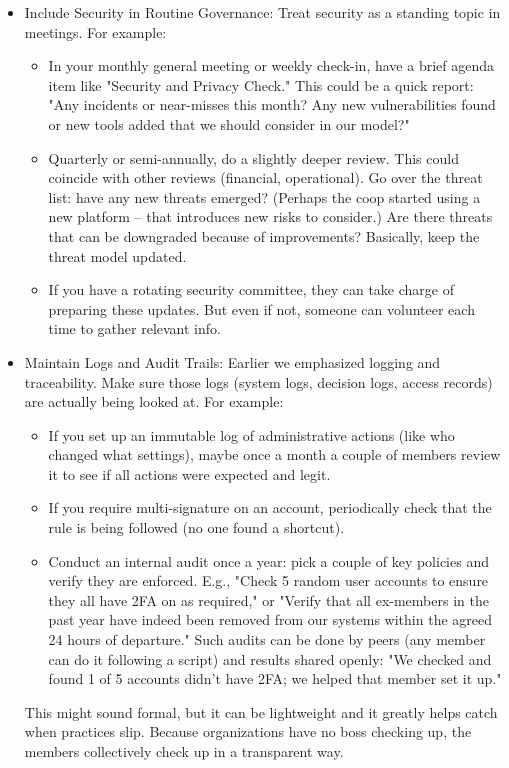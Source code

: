 \begin{itemize}   

    \item Include Security in Routine Governance: Treat security as a standing topic in meetings. For
    example:
        \begin{itemize}
            \item In your monthly general meeting or weekly check-in, have a brief agenda item like
            "Security and Privacy Check." This could be a quick report: "Any incidents or near-misses this
            month? Any new vulnerabilities found or new tools added that we should consider in our model?"
            \item Quarterly or semi-annually, do a slightly deeper review. This could coincide with other
            reviews (financial, operational). Go over the threat list: have any new threats emerged? (Perhaps
            the coop started using a new platform – that introduces new risks to consider.) Are there threats
            that can be downgraded because of improvements? Basically, keep the threat model updated.
            \item If you have a rotating security committee, they can take charge of preparing these updates.
            But even if not, someone can volunteer each time to gather relevant info.
        \end{itemize}

    \item Maintain Logs and Audit Trails: Earlier we emphasized logging and traceability. Make sure
    those logs (system logs, decision logs, access records) are actually being looked at. For example:
        \begin{itemize}
            \item If you set up an immutable log of administrative actions (like who changed what settings),
            maybe once a month a couple of members review it to see if all actions were expected and legit.
            \item If you require multi-signature on an account, periodically check that the rule is being
            followed (no one found a shortcut).
            \item Conduct an internal audit once a year: pick a couple of key policies and verify they are
            enforced. E.g., "Check 5 random user accounts to ensure they all have 2FA on as required," or
            "Verify that all ex-members in the past year have indeed been removed from our systems within the
            agreed 24 hours of departure." Such audits can be done by peers (any member can do it following a
            script) and results shared openly: "We checked and found 1 of 5 accounts didn't have 2FA; we helped
            that member set it up."
        \end{itemize}
    This might sound formal, but it can be lightweight and it greatly helps catch when practices slip.
    Because organizations have no boss checking up, the members collectively check up in a transparent way.


\end{itemize}
